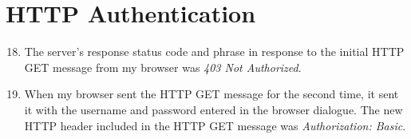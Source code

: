 \documentclass[12pt]{article}
\begin{document}
\section{HTTP Authentication}

\begin{enumerate}
		\setcounter{enumi}{17}
	\item{The server's response status code and phrase in response to the initial HTTP GET message from my browser was \textit{403 Not Authorized}.}
	\item{When my browser sent the HTTP GET message for the second time, it sent it with the username and password entered in the browser dialogue. The new HTTP header included in the HTTP GET message was \textit{Authorization: Basic}.}
\end{enumerate}
\end{document}

